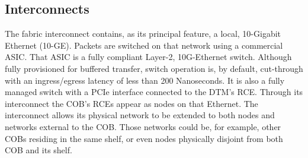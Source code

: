\subsection{Interconnects}
\label{sec:Interconnects}
The fabric interconnect contains, as its principal feature, a local, 10-Gigabit Ethernet (10-GE). Packets are switched on that network using a commercial  ASIC. That ASIC is a fully compliant Layer-2, 10G-Ethernet switch. Although fully provisioned for buffered transfer, switch operation is, by default, cut-through with an ingress/egress latency of less than 200 Nanoseconds. It is also a fully managed switch with a PCIe interface connected to the DTM's RCE. Through its interconnect the COB's RCEs appear as nodes on that Ethernet. The interconnect allows its physical network to be extended to both nodes and networks external to the COB. Those networks could be, for example, other COBs residing in the same shelf, or even nodes physically disjoint from both COB and its shelf.
%

